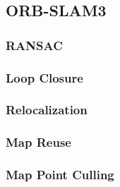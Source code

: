 \subsection{ORB-SLAM3}

\subsubsection{RANSAC}
\subsubsection{Loop Closure}
\subsubsection{Relocalization}
\subsubsection{Map Reuse}
\subsubsection{Map Point Culling}